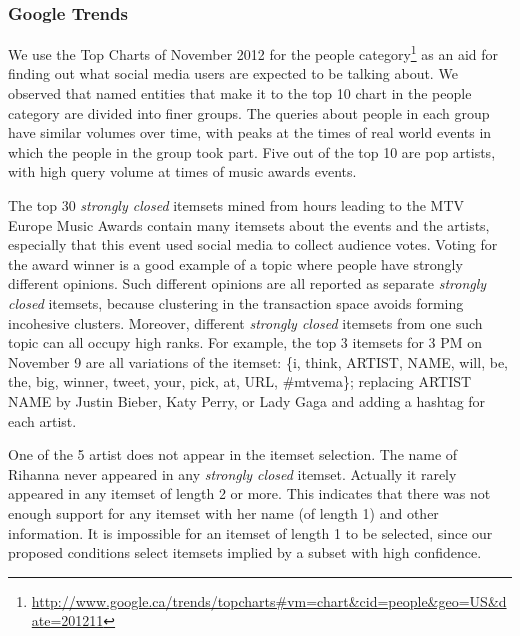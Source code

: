 \documentclass{sig-alternate}
\begin{document}
\subsubsection{Google Trends}
We use the Top Charts of November 2012 
for the people category\footnote{\url{http://www.google.ca/trends/topcharts\#vm=chart&cid=people&geo=US&date=201211}}
as an aid for finding out what social media users
are expected to be talking about.
We observed that named entities that make it to the top 10 chart in the people 
category  are divided into finer groups. 
The queries about 
people in each group 
have similar volumes over time, 
with peaks at the times of real world events
in which the people in the group took part.
Five out of the top 10 are pop artists, 
with high query volume at times of music awards events.

The top 30 \emph{strongly closed} itemsets mined from hours leading to 
the MTV Europe Music Awards contain
many itemsets about the events and the artists, 
especially that this event used social media to collect audience votes. 
Voting for the award winner is 
a good example of a topic where people have strongly different opinions.
Such different opinions are all reported as separate \emph{strongly closed} itemsets, 
because clustering in the transaction space avoids forming incohesive clusters. 
Moreover, different  \emph{strongly closed} itemsets from one such topic
can all occupy high ranks.
For example, the top 3 itemsets for 3 PM on November 9 are all variations of the %
itemset: \{i, think, ARTIST, NAME, will, be, the, big, winner, tweet, your, pick, at, URL, %
\#mtvema\}; replacing ARTIST NAME by Justin Bieber, Katy Perry, or Lady Gaga and adding a hashtag for each artist.

One of the 5 artist does not appear in the itemset selection. 
The name of Rihanna never appeared in any \emph{strongly closed} itemset.
Actually it rarely appeared in any itemset of length 2 or more. 
This indicates that there was not enough support for any itemset
with her name (of length 1) and other information.
It is impossible for an itemset of length 1 to be selected,
since our proposed conditions select itemsets implied
by a subset with high confidence.
\end{document}
